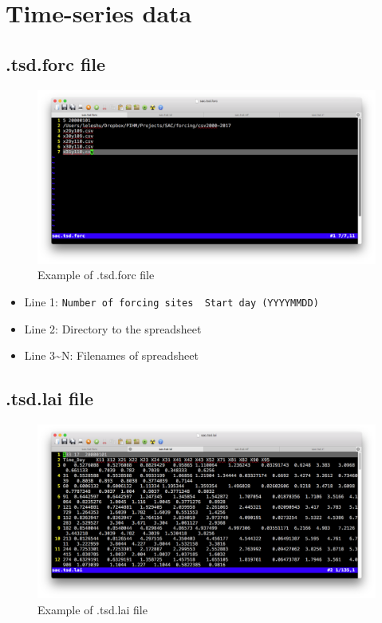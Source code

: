 \documentclass[]{scrbook}
\providecommand{\tightlist}{%
  \setlength{\itemsep}{0pt}\setlength{\parskip}{0pt}}
\begin{document}
\section{Time-series data}\label{time-series-data}

\subsection{.tsd.forc file}\label{tsd.forc-file}

\begin{figure}
\centering
\includegraphics{Fig/IO/tsd.forc.png}
\caption{Example of .tsd.forc file}
\end{figure}

\begin{itemize}
\tightlist
\item
  Line 1:
  \texttt{Number\ of\ forcing\ sites\ \textbar{}\ Start\ day\ (YYYYMMDD)}
\item
  Line 2: Directory to the spreadsheet
\item
  Line 3\textasciitilde{}N: Filenames of spreadsheet
\end{itemize}

\subsection{.tsd.lai file}\label{tsd.lai-file}

\begin{figure}
\centering
\includegraphics{Fig/IO/tsd.lai.png}
\caption{Example of .tsd.lai file}
\end{figure}
\end{document}
